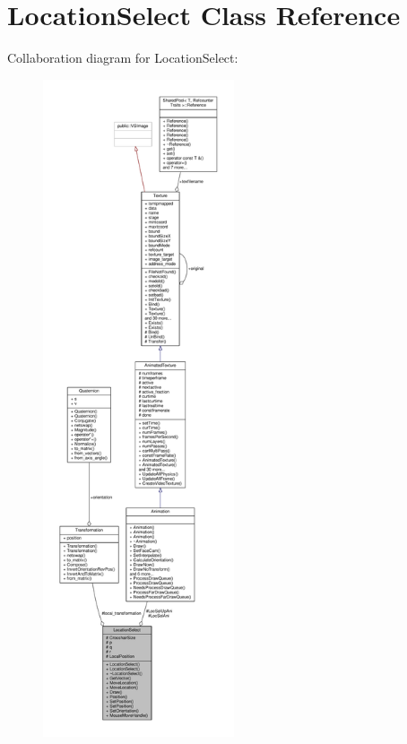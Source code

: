 \hypertarget{classLocationSelect}{}\section{Location\+Select Class Reference}
\label{classLocationSelect}


Collaboration diagram for Location\+Select\+:
\nopagebreak
\begin{figure}[H]
\begin{center}
\leavevmode
\includegraphics[height=550pt]{da/d1e/classLocationSelect__coll__graph}
\end{center}
\end{figure}
